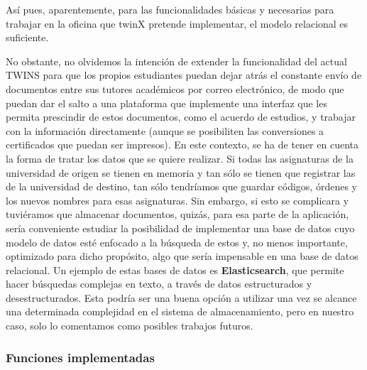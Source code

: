 Así pues, aparentemente, para las funcionalidades básicas y necesarias para trabajar en la oficina que twinX pretende implementar, el modelo relacional es suficiente.

No obstante, no olvidemos la intención de extender la funcionalidad del actual TWINS para que los propios estudiantes puedan dejar atrás el constante envío de documentos entre sus tutores académicos por correo electrónico, de modo que puedan dar el salto a una plataforma que implemente una interfaz que les permita prescindir de estos documentos, como el acuerdo de estudios, y trabajar con la información directamente (aunque se posibiliten las conversiones a certificados que puedan ser impresos). En este contexto, se ha de tener en cuenta la forma de tratar los datos que se quiere realizar. Si todas las asignaturas de la universidad de origen se tienen en memoria y tan sólo se tienen que registrar las de la universidad de destino, tan sólo tendríamos que guardar códigos, órdenes y los nuevos nombres para esas asignaturas. Sin embargo, si esto se complicara y tuviéramos que almacenar documentos, quizás, para esa parte de la aplicación, sería conveniente estudiar la posibilidad de implementar una base de datos cuyo modelo de datos esté enfocado a la búsqueda de estos y, no menos importante, optimizado para dicho propósito, algo que sería impensable en una base de datos relacional. Un ejemplo de estas bases de datos es \textbf{Elasticsearch}, que permite hacer búsquedas complejas en texto, a través de datos estructurados y desestructurados. Esta podría ser una buena opción a utilizar una vez se alcance una determinada complejidad en el sistema de almacenamiento, pero en nuestro caso, solo lo comentamos como posibles trabajos futuros.

\subsubsection{Funciones implementadas}

